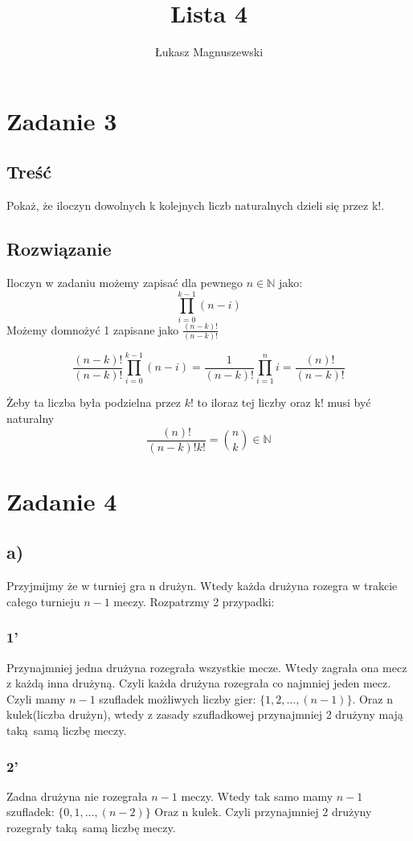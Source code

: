\documentclass{article}
\title{Lista 4}
\author{Łukasz Magnuszewski}
\date{\vspace{-5ex}}
\begin{document}
\maketitle

\section*{Zadanie 3}
\subsection*{Treść}
Pokaż, że iloczyn dowolnych k kolejnych liczb naturalnych dzieli się przez k!.
\subsection*{Rozwiązanie}
Iloczyn w zadaniu możemy zapisać dla pewnego $n \in \mathbb{N}$ jako:
\[\prod^{k-1}_{i = 0} (n-i)\]
Możemy domnożyć 1 zapisane jako $\frac{(n-k)!}{(n-k)!}$

\[\frac{(n-k)!}{(n-k)!} \prod^{k-1}_{i = 0} (n-i)  = \frac{1}{(n-k)!} \prod^{n}_{i=1} i  = \frac{(n)!}{(n-k)!}\]

Żeby ta liczba była podzielna przez $k!$ to iloraz tej liczby oraz k! musi być naturalny
\[\frac{(n)!}{(n-k)! k!} = {n\choose k} \in \mathbb{N} \]

\section*{Zadanie 4}
\subsection*{a)}
Przyjmijmy że w turniej gra n drużyn. Wtedy każda drużyna rozegra w trakcie całego turnieju $n-1$ meczy. Rozpatrzmy 2 przypadki:
\subsubsection*{1'}
Przynajmniej jedna drużyna rozegrała wszystkie mecze. Wtedy zagrała ona mecz z każdą inna drużyną. Czyli każda drużyna rozegrała co najmniej jeden mecz. Czyli mamy $n-1$ szufladek możliwych liczby gier: $\{1, 2, \ldots  ,(n-1)\}$. Oraz n kulek(liczba drużyn), wtedy z zasady szufladkowej przynajmniej 2 drużyny mają taką samą liczbę meczy.

\subsubsection*{2'}
Zadna drużyna nie rozegrała $n-1$ meczy. Wtedy tak samo mamy $n-1$ szufladek: $\{0,1, \ldots ,(n-2)\}$ Oraz n kulek. Czyli przynajmniej 2 drużyny rozegrały taką samą liczbę meczy.
\end{document}
